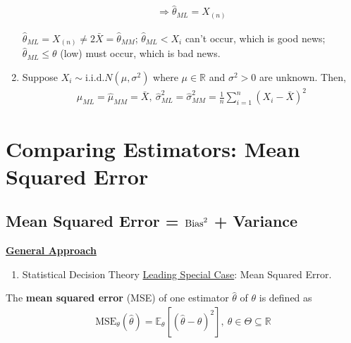 \documentclass[11pt]{elegantbook}
\begin{document}
\begin{example}
\begin{enumerate}
\begin{equation}
\begin{aligned}
            \Rightarrow \hat{\theta}_{ML}=X_{(n)}
        \end{aligned}
        \nonumber
    \end{equation}
    \begin{remark}
        $\hat{\theta}_{ML}=X_{(n)}\neq 2\bar{X}=\hat{\theta}_{MM}$; $\hat{\theta}_{ML}<X_i$ can't occur, which is good news; $\hat{\theta}_{ML}\leq \theta$ (low) must occur, which is bad news.
    \end{remark}
    \item Suppose $X_i\sim \text{i.i.d.}N(\mu,\sigma^2)$ where $\mu\in \mathbb{R}$ and $\sigma^2>0$ are unknown. Then,
    \begin{equation}
        \begin{aligned}
            \hat{\mu}_{ML}=\hat{\mu}_{MM}=\bar{X},\ \hat{\sigma}^2_{ML}=\hat{\sigma}^2_{MM}=\frac{1}{n}\sum_{i=1}^n (X_i-\bar{X})^2
        \end{aligned}
        \nonumber
    \end{equation}
\end{enumerate}
\end{example}

\section{Comparing Estimators: Mean Squared Error}
\subsection{Mean Squared Error = $\textnormal{Bias}^2$ + Variance}
\textbf{\underline{General Approach}}
\begin{enumerate}[$\circ$]
    \item Statistical Decision Theory
    \subitem \underline{Leading Special Case}: Mean Squared Error.
\end{enumerate}

\begin{definition}
    \normalfont
    The \textbf{mean squared error} (MSE) of one estimator $\hat{\theta}$ of $\theta$ is defined as
    \begin{equation}
        \begin{aligned}
            \text{MSE}_\theta(\hat{\theta})=\mathbb{E}_\theta[(\hat{\theta}-\theta)^2],\ \theta\in \Theta\subseteq \mathbb{R}
        \end{aligned}
        \nonumber
    \end{equation}
\end{definition}
\end{document}
